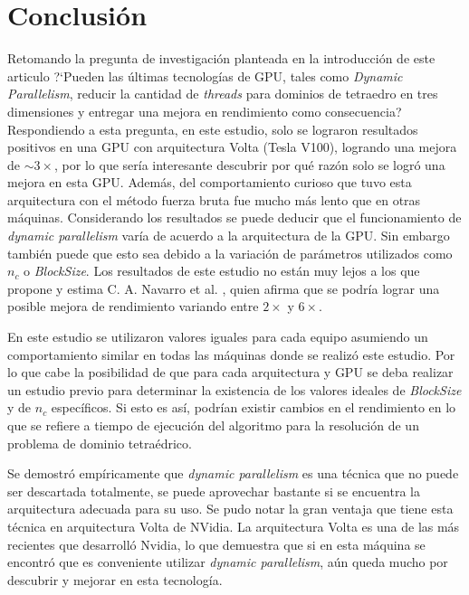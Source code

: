 \documentclass[10pt, conference, compsocconf, onecolumn]{IEEEtran}
\begin{document}
\section{Conclusi\'on}
Retomando la pregunta de investigaci\'on planteada en la introducci\'on de este articulo ?`Pueden las \'ultimas tecnolog\'ias de GPU, tales como \textit{Dynamic Parallelism}, reducir la cantidad de \textit{threads} para dominios de tetraedro en tres dimensiones y entregar una mejora en rendimiento como consecuencia? Respondiendo a esta pregunta, en este estudio, solo se lograron resultados positivos en una GPU con arquitectura Volta (Tesla V100), logrando una mejora de $\sim 3\times$, por lo que ser\'ia interesante descubrir por qu\'e raz\'on solo se logr\'o una mejora en esta GPU. Adem\'as, del comportamiento curioso que tuvo esta arquitectura con el m\'etodo fuerza bruta fue mucho m\'as lento que en otras m\'aquinas. Considerando los resultados se puede deducir que el funcionamiento de \textit{dynamic parallelism} var\'ia de acuerdo a la arquitectura de la GPU. Sin embargo tambi\'en puede que esto sea debido a la variaci\'on de par\'ametros utilizados como $n_{c}$ o \textit{BlockSize}. Los resultados de este estudio no est\'an muy lejos a los que propone y estima C. A. Navarro et al. \cite{PossiRec2016}, quien afirma que se podr\'ia lograr una posible mejora de rendimiento variando entre $2\times$ y $6\times$.
 

En este estudio se utilizaron valores iguales para cada equipo asumiendo un comportamiento similar en todas las m\'aquinas donde se realiz\'o este estudio. Por lo que cabe la posibilidad de que para cada arquitectura y GPU se deba realizar un estudio previo para determinar la existencia de los valores ideales de \textit{BlockSize} y de $n_{c}$ espec\'ificos. Si esto es as\'i, podr\'ian existir cambios en el rendimiento en lo que se refiere a tiempo de ejecuci\'on del algoritmo para la resoluci\'on de un problema de dominio tetra\'edrico.

 Se demostr\'o emp\'iricamente que \textit{dynamic parallelism} es una t\'ecnica que no puede ser descartada totalmente, se puede aprovechar bastante si se encuentra la arquitectura adecuada para su uso. Se pudo notar la gran ventaja que tiene esta t\'ecnica en arquitectura Volta de NVidia. La arquitectura Volta es una de las m\'as recientes que desarroll\'o Nvidia, lo que demuestra que si en esta m\'aquina se encontr\'o que es conveniente utilizar \textit{dynamic parallelism}, a\'un queda mucho por descubrir y mejorar en esta tecnolog\'ia. 
\end{document}
